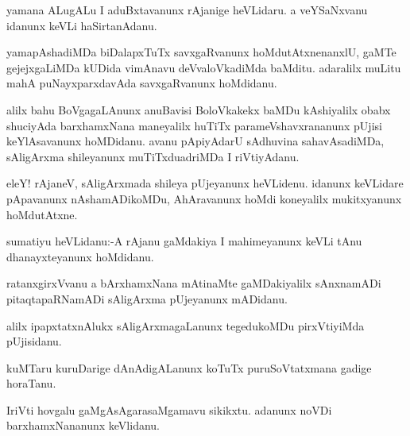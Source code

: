 \documentclass{article}
\begin{document}
\begin{mn}%
yamana ALugALu I aduBxtavanunx rAjanige heVLidaru. a veYSaNxvanu idanunx keVLi haSirtanAdanu.
\end{mn}

\begin{mn}%
yamapAshadiMDa biDalapxTuTx savxgaRvanunx hoMdutAtxnenanxlU, gaMTe gejejxgaLiMDa kUDida 
vimAnavu deVvaloVkadiMda baMditu. adaralilx muLitu mahA puNayxparxdavAda savxgaRvanunx 
hoMdidanu.
\end{mn}

\begin{mn}%
alilx bahu BoVgagaLAnunx anuBavisi BoloVkakekx baMDu kAshiyalilx obabx shuciyAda 
barxhamxNana maneyalilx huTiTx parameVshavxrananunx pUjisi keYlAsavanunx hoMDidanu. avanu 
pApiyAdarU sAdhuvina sahavAsadiMDa, sAligArxma shileyanunx muTiTxduadriMDa I riVtiyAdanu.
\end{mn}

\begin{mn}%
eleY! rAjaneV, sAligArxmada shileya pUjeyanunx heVLidenu. idanunx keVLidare pApavanunx 
nAshamADikoMDu, AhAravanunx hoMdi koneyalilx mukitxyanunx hoMdutAtxne.
\end{mn}


\begin{mn}%
sumatiyu heVLidanu:-A rAjanu gaMdakiya I mahimeyanunx keVLi tAnu dhanayxteyanunx hoMdidanu.
\end{mn}

\begin{mn}%
ratanxgirxVvanu a bArxhamxNana mAtinaMte gaMDakiyalilx sAnxnamADi pitaqtapaRNamADi 
sAligArxma pUjeyanunx mADidanu.
\end{mn}

\begin{mn}%
alilx ipapxtatxnAlukx sAligArxmagaLanunx tegedukoMDu pirxVtiyiMda pUjisidanu.
\end{mn}

\begin{mn}%
kuMTaru kuruDarige dAnAdigALanunx koTuTx puruSoVtatxmana gadige horaTanu.
\end{mn}

\begin{mn}%
IriVti hovgalu gaMgAsAgarasaMgamavu sikikxtu. adanunx noVDi barxhamxNananunx keVlidanu.
\end{mn}
\end{document}
